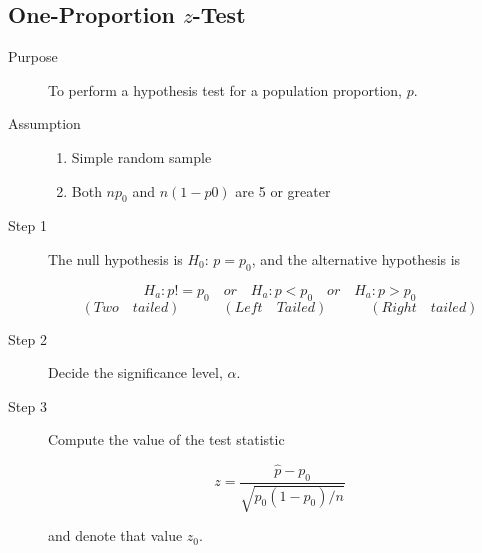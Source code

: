 \documentclass[12pt]{article}
\begin{document}
        \subsection*{One-Proportion $z$-Test}
            \begin{description}
                \item[Purpose] To perform a hypothesis test for a population proportion,
                $p$.
                \item[Assumption] 
                \begin{enumerate}
                    \item Simple random sample
                    \item Both $np_0$ and $n(1-p0)$ are 5 or greater
                \end{enumerate}
                \item[Step 1] The null hypothesis is $H_0$: $p = p_0$, and the alternative
                hypothesis is 
                \begin{center}
                    \[
                        H_a: p != p_0 \quad or \quad H_a: p < p_0 \quad or \quad 
                        H_a: p > p_0    
                    \]
                    \[
                        (Two \quad tailed)\quad\quad\quad(Left \quad Tailed)\quad\quad\quad
                        (Right \quad tailed)    
                    \]                    
                \end{center}
                \item[Step 2] Decide the significance level, $\alpha$.
                \item[Step 3] Compute the value of the test statistic
                \begin{center}
                    \[
                        z = \frac{\hat{p}-p_0}{\sqrt{p_0(1-p_0)/n}}    
                    \]
                \end{center}  
                and denote that value $z_0$.
            \end{description}
\end{document}
